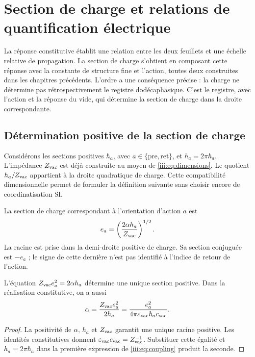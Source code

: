 \section{Section de charge et relations de quantification électrique}
\label{iii:sec:carga}

La réponse constitutive établit une relation entre les deux feuillets et une échelle relative de propagation. La section de charge s'obtient en composant cette réponse avec la constante de structure fine et l'action, toutes deux construites dans les chapitres précédents. L'ordre a une conséquence précise : la charge ne détermine pas rétrospectivement le registre dodécaphasique. C'est le registre, avec l'action et la réponse du vide, qui détermine la section de charge dans la droite correspondante.

\subsection{Détermination positive de la section de charge}

Considérons les sections positives $\hbar_a$, avec
$a\in\{\mathrm{pre},\mathrm{ret}\}$, et $h_a=2\pi\hbar_a$.
L’impédance $Z_{\rm vac}$ est déjà construite au moyen de
\eqref{iii:eq:dimensions}. Le quotient $h_a/Z_{\rm vac}$ appartient à
la droite quadratique de charge. Cette compatibilité dimensionnelle permet de
formuler la définition suivante sans choisir encore de coordinatisation SI.

\begin{definition}
La section de charge correspondant à l’orientation d’action $a$ est
\begin{equation}
 e_a=\left(\frac{2\alpha h_a}{Z_{\rm vac}}\right)^{1/2}.
 \label{iii:eq:charge}
\end{equation}
La racine est prise dans la demi-droite positive de charge. Sa section conjuguée
est $-e_a$ ; le signe de cette dernière n’est pas identifié à l’indice de
retour de l’action.
\end{definition}

\begin{proposition}
L’équation $Z_{\rm vac}e_a^2=2\alpha h_a$ détermine une unique section
positive. Dans la réalisation constitutive, on a aussi
\begin{equation}
 \alpha=\frac{Z_{\rm vac}e_a^2}{2h_a}
 =\frac{e_a^2}{4\pi\varepsilon_{\rm vac}\hbar_a c_{\rm vac}}.
 \label{iii:eq:coupling}
\end{equation}
\end{proposition}
\begin{proof}
La positivité de $\alpha$, $h_a$ et $Z_{\rm vac}$ garantit une unique racine positive. Les identités constitutives donnent $\varepsilon_{\rm vac}c_{\rm vac}=Z_{\rm vac}^{-1}$. Substituer cette égalité et $h_a=2\pi\hbar_a$ dans la première expression de \eqref{iii:eq:coupling} produit la seconde.
\end{proof}

